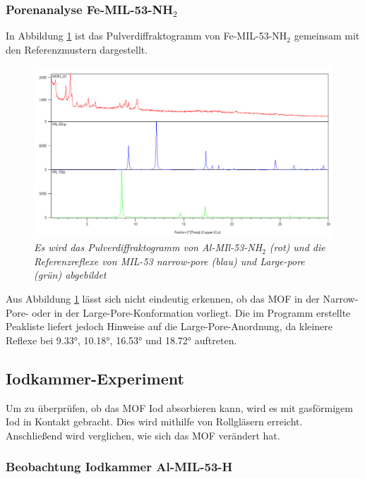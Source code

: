 \documentclass[12pt, a4paper]{article}
\begin{document}
\newpage

\subsubsection{\texorpdfstring{Porenanalyse Fe-MIL-53-NH$_2$}{Porenanalyse Fe-MIL-53-NH2}} \label{poreeisenamino}
In Abbildung \ref{MOF220ver} ist das Pulverdiffraktogramm von Fe-MIL-53-NH$_2$ gemeinsam mit den Referenzmustern dargestellt. 

\begin{figure}[!h]
    \centering
    \includegraphics[scale=0.5]{MOF220ver.png}
    \caption{\textit{Es wird das Pulverdiffraktogramm von Al-MIl-53-NH$_2$ (rot) und die Referenzreflexe von MIL-53 narrow-pore (blau) und Large-pore (grün) abgebildet}}
    \label{MOF220ver}
\end{figure}
\noindent
Aus Abbildung \ref{MOF220ver} lässt sich nicht eindeutig erkennen, ob das MOF in der Narrow-Pore- oder in der Large-Pore-Konformation vorliegt. Die im Programm erstellte 
Peakliste liefert jedoch Hinweise auf die Large-Pore-Anordnung, da kleinere Reflexe bei 9.33°, 10.18°, 16.53° und 18.72° auftreten.
\newpage
\subsection{Iodkammer-Experiment}
Um zu überprüfen, ob das MOF Iod absorbieren kann, wird es mit gasförmigem Iod in Kontakt gebracht. Dies wird mithilfe von Rollgläsern erreicht.
Anschließend wird verglichen, wie sich das MOF verändert hat.
\subsubsection{Beobachtung Iodkammer Al-MIL-53-H}
\end{document}
